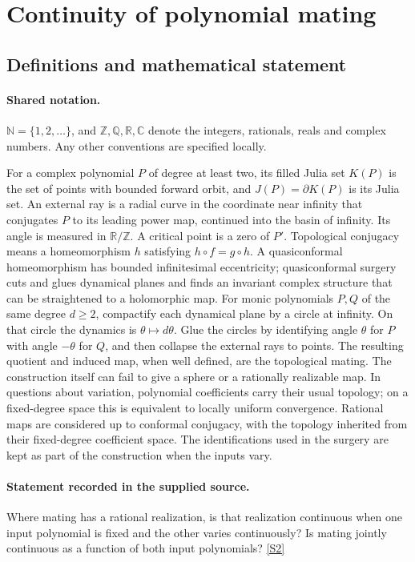 \documentclass[11pt]{article}
\newcommand{\sref}[2]{\hyperlink{source:#1:#2}{[S#2]}}
\begin{document}
\section{Continuity of polynomial mating}\label{statement}

\subsection{Definitions and mathematical statement}

\paragraph{Shared notation.}$\mathbb N=\{1,2,\ldots\}$, and $\mathbb Z,\mathbb Q,\mathbb R,\mathbb C$ denote the integers, rationals, reals and complex numbers. Any other conventions are specified locally.


For a complex polynomial $P$ of degree at least two, its filled Julia set $K(P)$ is the set of points with bounded forward orbit, and $J(P)=\partial K(P)$ is its Julia set. An external ray is a radial curve in the coordinate near infinity that conjugates $P$ to its leading power map, continued into the basin of infinity. Its angle is measured in $\mathbb R/\mathbb Z$. A critical point is a zero of $P'$. Topological conjugacy means a homeomorphism $h$ satisfying $h\circ f=g\circ h$. A quasiconformal homeomorphism has bounded infinitesimal eccentricity; quasiconformal surgery cuts and glues dynamical planes and finds an invariant complex structure that can be straightened to a holomorphic map.
For monic polynomials $P,Q$ of the same degree $d\geq2$, compactify each dynamical plane by a circle at infinity. On that circle the dynamics is $\theta\mapsto d\theta$. Glue the circles by identifying angle $\theta$ for $P$ with angle $-\theta$ for $Q$, and then collapse the external rays to points. The resulting quotient and induced map, when well defined, are the topological mating. The construction itself can fail to give a sphere or a rationally realizable map.
In questions about variation, polynomial coefficients carry their usual topology; on a fixed-degree space this is equivalent to locally uniform convergence. Rational maps are considered up to conformal conjugacy, with the topology inherited from their fixed-degree coefficient space. The identifications used in the surgery are kept as part of the construction when the inputs vary.
\paragraph{Statement recorded in the supplied source.}
Where mating has a rational realization, is that realization continuous when one input polynomial is fixed and the other varies continuously? Is mating jointly continuous as a function of both input polynomials? \sref{statement}{2}
\end{document}
